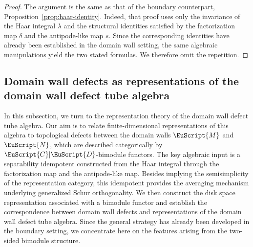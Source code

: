 \documentclass[a4paper,11pt]{article}
\theoremstyle{definition}
\theoremstyle{remark}
\newcommand\eC           {\EuScript{C}}
\newcommand\eD           {\EuScript{D}}
\newcommand\eM          {\EuScript{M}}
\newcommand\eN         {\EuScript{N}}
\begin{document}
\begin{proof}
    The argument is the same as that of the boundary counterpart, Proposition~\ref{prop:haar-identity}. Indeed, that proof uses only the invariance of the Haar integral $\lambda$ and the structural identities satisfied by the factorization map $\delta$ and the antipode-like map $s$. Since the corresponding identities have already been established in the domain wall setting, the same algebraic manipulations yield the two stated formulas. We therefore omit the repetition.
\end{proof}




\subsection{Domain wall defects as representations of the domain wall defect tube algebra}

In this subsection, we turn to the representation theory of the domain wall defect tube algebra. Our aim is to relate finite-dimensional representations of this algebra to topological defects between the domain walls $\eM$ and $\eN$, which are described categorically by $\eC|\eD$-bimodule functors. The key algebraic input is a separability idempotent constructed from the Haar integral through the factorization map and the antipode-like map. Besides implying the semisimplicity of the representation category, this idempotent provides the averaging mechanism underlying generalized Schur orthogonality. We then construct the disk space representation associated with a bimodule functor and establish the correspondence between domain wall defects and representations of the domain wall defect tube algebra. Since the general strategy has already been developed in the boundary setting, we concentrate here on the features arising from the two-sided bimodule structure.
\end{document}
